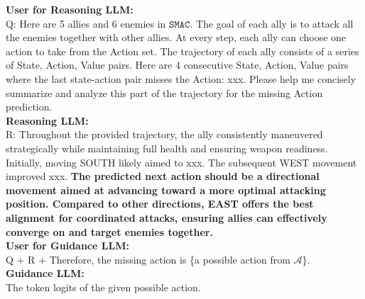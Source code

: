 \begin{tcolorbox}[title=An example that the prompts used for the \elm~and the \rlm~on the $\mathtt{SMAC}$ datasets]
    \textbf{\textcolor{usercolor}{User for Reasoning LLM:}} \\
   Q: Here are 5 allies and 6 enemies in $\mathtt{SMAC}$. The goal of each ally is to attack all the enemies together with other allies. At every step, each ally can choose one action to take from the Action set. The trajectory of each ally consists of a series of {State, Action, Value} pairs. Here are 4 consecutive {State, Action, Value} pairs where the last state-action pair misses the Action: xxx. Please help me concisely summarize and analyze this part of the trajectory for the missing Action prediction.\\
    
    \vspace{1ex}
    \textbf{\textcolor{cotcolor}{Reasoning LLM:}} \\
R: Throughout the provided trajectory, the ally consistently maneuvered strategically while maintaining full health and ensuring weapon readiness. Initially, moving SOUTH likely aimed to xxx. The subsequent WEST movement improved xxx. \textbf{The predicted next action should be a directional movement aimed at advancing toward a more optimal attacking position. Compared to other directions, EAST offers the best alignment for coordinated attacks, ensuring allies can effectively converge on and target enemies together.}\\
    
    \vspace{1ex}
    \textbf{\textcolor{outputcolor}{User for Guidance LLM:}} \\
Q + R + Therefore, the missing action is \{a possible action from $\mathcal{A}$\}.\\
 
 \vspace{1ex}
 \textbf{\textcolor{outputcolor}{Guidance LLM:}}\\
The token logits of the given possible action.\\

\label{box: flow_smac}
\end{tcolorbox}